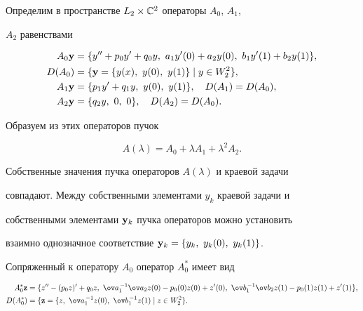 Определим в пространстве $L_2\times\Bbb C^2$ операторы $A_0$, $A_1$, 


$A_2$ равенствами 


\begin{align*} 


A_0{\bold y}{} & =\{y''+p_0y'+q_0y,\ a_1y'(0)+a_2y(0), 


\ b_1y'(1)+b_2y(1)\}, \\ 


% 


D(A_0){} & =\{\bold y=\{y(x),\ y(0),\ y(1)\}\mid y\in W^2_2\}, \\ 


% 


A_1{\bold y}{} & = \{p_1y'+q_1y,\ y(0),\ y(1)\},\quad D(A_1)=D(A_0), \\ 


% 


A_2{\bold y}{} & = \{q_2y,\ 0,\ 0\},\quad D(A_2)=D(A_0). 


\end{align*} 


Образуем из этих операторов пучок  


\begin{equation} 


A(\lambda)=A_0+\lambda A_1+\lambda^2A_2. 


\end{equation} 


Собственные значения пучка операторов $A(\lambda)$ и краевой задачи  


совпадают. Между собственными элементами $y_k$ краевой задачи и  


собственными элементами $\bold y_k$ пучка операторов можно установить  


взаимно однозначное соответствие $\bold y_k=\{y_k,\ y_k(0),\ y_k(1)\}$. 


 


Сопряженный к оператору $A_0$ оператор $A^*_0$ имеет вид 


\begin{align*} 


A^*_0\bold z&=\{z''-(p_0z)'+q_0z,\ \ov a_1^{\,-1}\ov a_2z(0)- 


p_0(0)z(0)+z'(0),\ \ov b_1^{\,-1}\ov b_2z(1)-p_0(1)z(1)+ 


z'(1)\},\\ 


% 


D(A^*_0)&=\{\bold z=\{z,\ \ov a_1^{\,-1}z(0), 


\ \ov b_1^{\,-1}z(1)\mid z\in W^2_2\}. 


\end{align*} 


